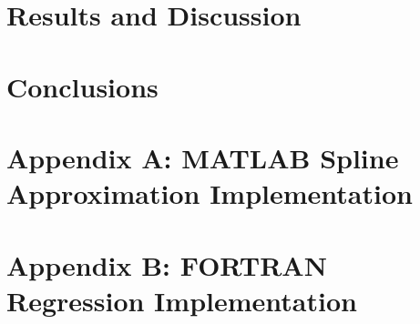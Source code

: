 \documentclass[12pt, letterpaper]{article} %
\begin{document}
\section*{Results and Discussion}

\section*{Conclusions}

\section*{Appendix A: MATLAB Spline Approximation Implementation}

\section*{Appendix B: FORTRAN Regression Implementation}
\end{document}
